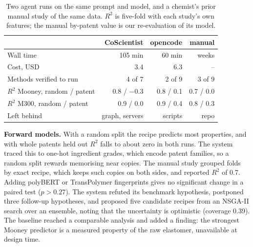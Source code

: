 \documentclass[letterpaper]{article} %
\begin{document}
\begin{table}[t]
\centering
\footnotesize
\setlength{\tabcolsep}{3pt}
\begin{tabular}{@{}lrrr@{}}
\toprule
 & CoScientist & opencode & manual \\
\midrule
Wall time                          & 105 min & 60 min & weeks \\
Cost, USD                          & 3.4 & 6.3 & -- \\
Methods verified to run            & 4 of 7 & 2 of 9 & 3 of 9 \\
$R^2$ Mooney, random / patent   & 0.8 / $-$0.3 & 0.8 / 0.1 & 0.7 / 0.0 \\
$R^2$ M300, random / patent     & 0.9 / 0.0 & 0.9 / 0.4 & 0.8 / 0.3 \\
Left behind & graph, servers & scripts & repo \\
\bottomrule
\end{tabular}
\caption{Two agent runs on the same prompt and model, and a chemist's prior
manual study of the same data. $R^2$ is five-fold with each study's own
features; the manual by-patent value is our re-evaluation of its model.}
\label{tab:runs}
\end{table}

\textbf{Forward models.} With a random split the recipe predicts most
properties, and with whole patents held out $R^2$ falls to about zero in both
runs. The system traced this to one-hot ingredient grades, which encode patent
families, so a random split rewards memorising near copies. The
manual study grouped folds by exact recipe, which keeps such copies on both
sides, and reported $R^2$ of 0.7. Adding polyBERT or TransPolymer fingerprints
gives no significant change in a paired test ($p>0.27$). The system refuted its
benchmark hypothesis, postponed three follow-up hypotheses, and proposed five
candidate recipes from an NSGA-II search over an ensemble, noting that the
uncertainty is optimistic (coverage 0.39). The baseline reached a comparable
analysis and added a finding: the strongest Mooney predictor is a measured
property of the raw elastomer, unavailable at design time.
\end{document}

